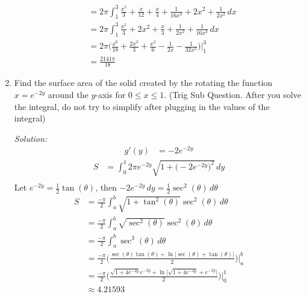 \documentclass[16pt]{article}
\theoremstyle{remark}
\begin{document}
\begin{enumerate}
\begin{mdframed}[style=TheoremFrame]
\begin{align*}
&= 2\pi \int_1^3 \frac{x^5}{3} +  \frac{x}{12} + \frac{x}{4} + \frac{1}{16x^3} + 2x^2 + \frac{1}{2x^2} \, dx\\[1.5ex]
&= 2\pi \int_1^3 \frac{x^5}{3} + 2x^2 + \frac{x}{3} +\frac{1}{2x^2}+ \frac{1}{16x^3} \, dx\\[1.5ex]
&= 2\pi \bigg(\frac{x^6}{18} + \frac{2x^3}{3}+\frac{x^2}{6} -\frac{1}{2x}- \frac{1}{32x^2}\bigg) \bigg|_1^3\\[1.5ex]
&= \frac{2141\pi}{18}
\end{align*}
\end{mdframed}
\newpage
\item Find the surface area of the solid created by the rotating the function $x = e^{-2y}$ around the $y$-axis for $0 \leq x \leq 1$. (Trig Sub Question. After you solve the integral, do not try to simplify after plugging in the values of the integral)
\begin{mdframed}[style=TheoremFrame]
\textit{Solution:}
\begin{align*}
g'(y) &= -2e^{-2y}
\end{align*}
\begin{align*}
S&= \int_0^1 2\pi e^{-2y} \sqrt{1+\big(-2e^{-2y}\big)^2} \, dy\\
\end{align*}
Let $\displaystyle{e^{-2y} = \frac{1}{2}\tan(\theta)}$, then $\displaystyle{-2e^{-2y} \, dy = \frac{1}{2} \sec^2(\theta) \, d\theta}$
\begin{align*}
S&= \frac{-\pi}{2} \int_a^b \sqrt{1+\tan^2(\theta)} \sec^2 (\theta) \, d\theta\\[1.5ex]
&= \frac{-\pi}{2} \int_a^b \sqrt{\sec^2(\theta)} \sec^2 (\theta) \, d\theta\\[1.5ex]
&= \frac{-\pi}{2} \int_a^b \sec^3 (\theta) \, d\theta\\[1.5ex]
&= \frac{-\pi}{2}\bigg(\frac{\sec(\theta)\tan(\theta) + \ln\big|\sec(\theta)+\tan(\theta)\big|}{2}\bigg) \bigg|_a^b\\[1.5ex]
&= \frac{-\pi}{2}\bigg(\frac{\sqrt{1+4e^{-4y}}e^{-2y} + \ln\big|\sqrt{1+4e^{-4y}}+e^{-2y}\big|}{2}\bigg) \bigg|_0^1\\[1.5ex]
&\approx 4.21593
\end{align*}
\end{mdframed}
\end{enumerate}
\end{document}
